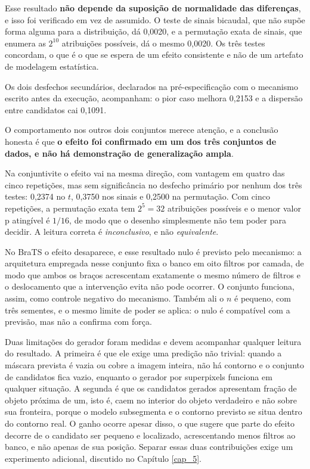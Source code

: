 Esse resultado \textbf{não depende da suposição de normalidade das diferenças}, e isso foi verificado em vez de assumido. O teste de sinais bicaudal, que não supõe forma alguma para a distribuição, dá 0,0020, e a permutação exata de sinais, que enumera as $2^{10}$ atribuições possíveis, dá o mesmo 0,0020. Os três testes concordam, o que é o que se espera de um efeito consistente e não de um artefato de modelagem estatística.

Os dois desfechos secundários, declarados na pré-especificação com o mecanismo escrito antes da execução, acompanham: o pior caso melhora 0,2153 e a dispersão entre candidatos cai 0,1091.

O comportamento nos outros dois conjuntos merece atenção, e a conclusão honesta é que \textbf{o efeito foi confirmado em um dos três conjuntos de dados, e não há demonstração de generalização ampla}.

Na conjuntivite o efeito vai na mesma direção, com vantagem em quatro das cinco repetições, mas sem significância no desfecho primário por nenhum dos três testes: 0,2374 no $t$, 0,3750 nos sinais e 0,2500 na permutação. Com cinco repetições, a permutação exata tem $2^5 = 32$ atribuições possíveis e o menor valor p atingível é $1/16$, de modo que o desenho simplesmente não tem poder para decidir. A leitura correta é \emph{inconclusivo}, e não \emph{equivalente}.

No BraTS o efeito desaparece, e esse resultado nulo é previsto pelo mecanismo: a arquitetura empregada nesse conjunto fixa o banco em oito filtros por camada, de modo que ambos os braços acrescentam exatamente o mesmo número de filtros e o deslocamento que a intervenção evita não pode ocorrer. O conjunto funciona, assim, como controle negativo do mecanismo. Também ali o $n$ é pequeno, com três sementes, e o mesmo limite de poder se aplica: o nulo é compatível com a previsão, mas não a confirma com força.

Duas limitações do gerador foram medidas e devem acompanhar qualquer leitura do resultado. A primeira é que ele exige uma predição não trivial: quando a máscara prevista é vazia ou cobre a imagem inteira, não há contorno e o conjunto de candidatos fica vazio, enquanto o gerador por superpixels funciona em qualquer situação. A segunda é que os candidatos gerados apresentam fração de objeto próxima de um, isto é, caem no interior do objeto verdadeiro e não sobre sua fronteira, porque o modelo subsegmenta e o contorno previsto se situa dentro do contorno real. O ganho ocorre apesar disso, o que sugere que parte do efeito decorre de o candidato ser pequeno e localizado, acrescentando menos filtros ao banco, e não apenas de sua posição. Separar essas duas contribuições exige um experimento adicional, discutido no Capítulo \ref{cap_5}.

